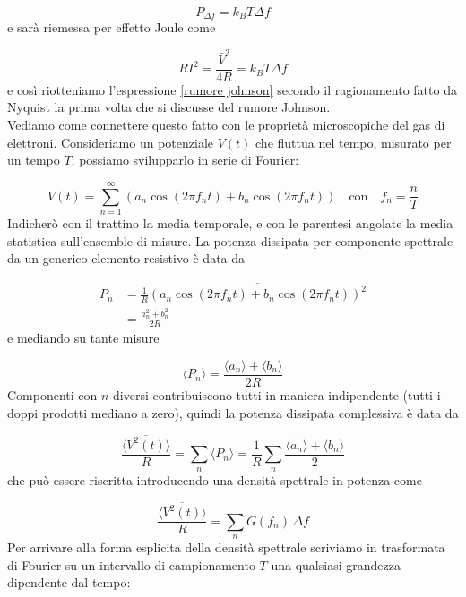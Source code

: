 \documentclass[a4paper]{report}
\begin{document}
\begin{equation}
    P_{\Delta f} = k_B T \Delta f
\end{equation}
e sarà riemessa per effetto Joule come

\begin{equation}
    R I^2 = \frac{\bar{V}^2}{4R} = k_B T \Delta f
\end{equation}
e così riotteniamo l'espressione \eqref{rumore johnson} secondo il ragionamento fatto da Nyquist la prima volta che si discusse del rumore Johnson. \\
Vediamo come connettere questo fatto con le proprietà microscopiche del gas di elettroni. Consideriamo un potenziale $V(t)$ che fluttua nel tempo, misurato per un tempo $T$; possiamo svilupparlo in serie di Fourier:

\begin{equation}
    V(t) = \sum_{n=1}^{\infty} \left(a_n \cos(2\pi f_n t) + b_n \cos(2\pi f_n t)\right) \quad \text{con}\quad f_n = \frac{n}{T}
\end{equation}
Indicherò con il trattino la media temporale, e con le parentesi angolate la media statistica sull'ensemble di misure. La potenza dissipata per componente spettrale da un generico elemento resistivo è data da

\begin{equation}
\begin{split}
    P_n & = \frac{1}{R}\overline{\left(a_n \cos(2\pi f_n t) + b_n \cos(2\pi f_n t)\right)^2} \\
    & = \frac{a_n^2+b_n^2}{2R}
    \end{split}
\end{equation}
e mediando su tante misure

\begin{equation}
    \langle P_n \rangle = \frac{\langle a_ n\rangle + \langle b_ n\rangle}{2R}
\end{equation}
Componenti con $n$ diversi contribuiscono tutti in maniera indipendente (tutti i doppi prodotti mediano a zero), quindi la potenza dissipata complessiva è data da

\begin{equation}
    \frac{\overline{\langle V^2(t)\rangle}}{R} = \sum_n \langle P_n \rangle = \frac{1}{R} \sum_n  \frac{\langle a_ n\rangle + \langle b_ n\rangle}{2}
\end{equation}
che può essere riscritta introducendo una densità spettrale in potenza come

\begin{equation}
  \frac{\overline{\langle V^2(t)\rangle}}{R}  = \sum_n G(f_n) \,\Delta f
\end{equation}
Per arrivare alla forma esplicita della densità spettrale scriviamo in trasformata di Fourier su un intervallo di campionamento $T$ una qualsiasi grandezza dipendente dal tempo:
\end{document}

